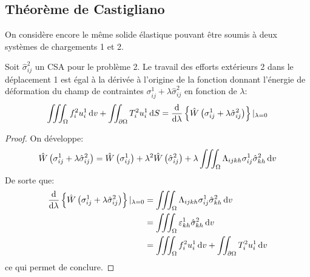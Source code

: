 \subsection{Théorème de Castigliano} \label{ssec:Ch09-2.2}
On considère encore le même solide élastique pouvant être soumis à deux systèmes de chargements 1 et 2. 
\begin{thm}
    Soit $\hat{\sigma}_{ij}^2$ un CSA pour le problème 2.
    Le travail des efforts extérieurs 2 dans le déplacement 1 est égal à la dérivée à l'origine de la fonction donnant l'énergie de déformation du champ de contraintes $\sigma_{ij}^1 + \lambda \hat{\sigma}_{ij}^2$ en fonction de $\lambda$:
    \begin{equation}
        \iiint_{\Omega} f_i^2 u_i^1 \mathop{\mathrm{{}d}}\mathopen{} v + \iint_{\partial \Omega} T_i^2 u_i^1 \mathop{\mathrm{{}d}}\mathopen{} S = \frac{\mathop{\mathrm{{}d}}\mathopen{}}{\mathop{\mathrm{{}d}}\mathopen{} \lambda} \left\{ \hat{W}\left( \sigma_{ij}^1 + \lambda \hat{\sigma}_{ij}^2 \right) \right\} |_{\lambda=0}
        \label{eq:Ch09-062}
    \end{equation}
\end{thm}
\begin{proof}
    On développe: 
    \[
    \hat{W}\left( \sigma_{ij}^1 + \lambda \hat{\sigma}_{ij}^2 \right) = \hat{W} \left( \sigma_{ij}^1 \right) + \lambda^2 \hat{W}\left( \hat{\sigma}_{ij}^2 \right) + \lambda \iiint_{\Omega} \Lambda_{ijkh} \sigma_{ij}^1 \hat{\sigma}_{kh}^2 \mathop{\mathrm{{}d}}\mathopen{} v
    \]
    De sorte que: 
    \begin{align*}
    \frac{\mathop{\mathrm{{}d}}\mathopen{}}{\mathop{\mathrm{{}d}}\mathopen{} \lambda} \left\{ \hat{W}\left( \sigma_{ij}^1 + \lambda \hat{\sigma}_{ij}^2 \right) \right\} |_{\lambda=0} &= \iiint_{\Omega} \Lambda_{ijkh} \sigma_{ij}^1 \hat{\sigma}_{kh}^2 \mathop{\mathrm{{}d}}\mathopen{} v \\
        &= \iiint_{\Omega} \varepsilon_{kh}^1 \hat{\sigma}_{kh}^2 \mathop{\mathrm{{}d}}\mathopen{} v \\
        &= \iiint_{\Omega} f_i^2 u_i^1 \mathop{\mathrm{{}d}}\mathopen{} v + \iint_{\partial \Omega} T_i^2 u_i^1 \mathop{\mathrm{{}d}}\mathopen{} v
    \end{align*}
ce qui permet de conclure.
\end{proof}


